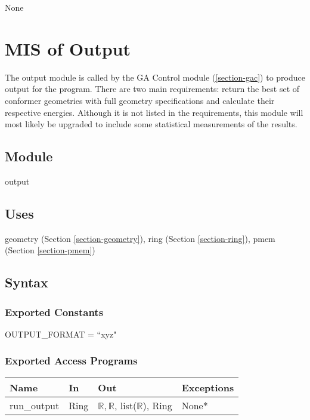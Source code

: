 \documentclass[12pt, titlepage]{article}
\begin{document}
None

\section{MIS of Output} \label{section-output}

The output module is called by the GA Control module (\ref{section-gac}) to 
produce output for the program. There are two main requirements: return the 
best set of conformer geometries with full geometry specifications and 
calculate their respective energies. Although it is not listed in the 
requirements, this module will most likely be upgraded to include some 
statistical measurements of the results.

\subsection{Module}

output

\subsection{Uses}

geometry (Section \ref{section-geometry}),
ring (Section \ref{section-ring}),
pmem (Section \ref{section-pmem})

\subsection{Syntax}

\subsubsection{Exported Constants}

OUTPUT\_FORMAT = ``xyz"

\subsubsection{Exported Access Programs}

\begin{center}
	\begin{tabular}{p{2cm} p{4cm} p{4cm} p{2cm}}
		\hline
		\textbf{Name} & \textbf{In} & \textbf{Out} & \textbf{Exceptions} \\
		\hline
		run\_output & Ring & $\mathbb{R}, \mathbb{R}$, list($\mathbb{R}$), Ring 
		& None* \\
		\hline
	\end{tabular}
\end{center}
\end{document}
